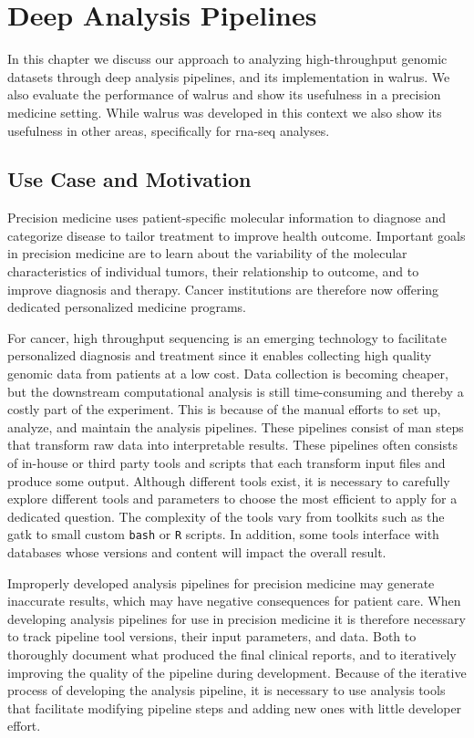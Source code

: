 \chapter{Deep Analysis Pipelines}\label{pipeline}  
In this chapter we discuss our approach to analyzing high-throughput genomic
datasets through deep analysis pipelines, and its implementation in 
walrus.\cite{walrus} We also evaluate the performance of walrus and show its
usefulness in a precision medicine setting. While walrus was developed in this
context we also show its usefulness in other areas, specifically for
\gls{rna}-seq analyses. 

\section{Use Case and Motivation} 
Precision medicine uses patient-specific molecular information to diagnose and
categorize disease to tailor treatment to improve health
outcome.\cite{national2011toward} Important goals in precision medicine are to
learn about the variability of the molecular characteristics of individual
tumors, their relationship to outcome, and to improve diagnosis and
therapy.\cite{tannock2016limits} Cancer institutions are therefore now
offering dedicated personalized medicine programs. 

For cancer, high throughput sequencing is an emerging technology to facilitate
personalized diagnosis and treatment since it enables collecting high quality
genomic data from patients at a low cost. Data collection is becoming cheaper,
but the downstream computational analysis is still time-consuming and thereby a
costly part of the experiment.  This is because of the manual efforts to set up,
analyze, and maintain the analysis pipelines. These pipelines consist of man 
steps that transform raw data into interpretable
results.\cite{diao2015building} These pipelines often consists of in-house or
third party tools and scripts that each transform input files and produce some
output. Although different tools exist, it is necessary to carefully explore
different tools and parameters to choose the most efficient to apply for a
dedicated question.\cite{servant2014bioinformatics} The complexity of the tools
vary from toolkits such as the \gls{gatk} to small custom \texttt{bash} or
\texttt{R} scripts.  In addition, some tools interface with databases whose
versions and content will impact the overall result.\cite{sboner2015primer}

Improperly developed analysis pipelines for precision medicine may generate
inaccurate results, which may have negative consequences for patient
care.\cite{roy2017standards} 
When developing analysis pipelines for use in precision medicine it is therefore
necessary to track pipeline tool versions, their input parameters, and data.
Both to thoroughly document what produced the final clinical reports, and
to iteratively improving the quality of the pipeline during development.
Because of the iterative process of developing the analysis pipeline, it is
necessary to use analysis tools that facilitate modifying pipeline steps and
adding new ones with little developer effort.

